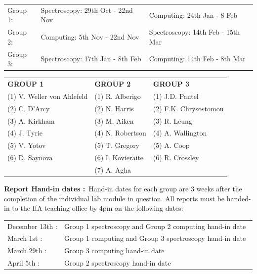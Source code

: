 \documentclass[12pt]{article}
\begin{document}
\begin{center}
\begin{tabular}{lll}
Group 1: & Spectroscopy: 29th Oct - 22nd Nov &Computing: 24th Jan - 8 Feb\\
Group 2: & Computing: 5th Nov - 22nd Nov     &Spectroscopy: 14th Feb - 15th Mar\\
Group 3: & Spectroscopy: 17th Jan - 8th Feb  & Computing: 14th Feb - 8th Mar
\end{tabular}
\end{center}

\begin{center}
\begin{tabular}{lll}

{\bf GROUP 1}                &   {\bf GROUP 2}      & {\bf GROUP 3}    \\
(1) V. Weller von Ahlefeld   & (1) R. Alberigo      & (1) J.D. Pantel\\
(2) C. D'Arcy                & (2) N. Harris        & (2) F.K. Chrysostomou\\
(3) A. Kirkham               & (3) M. Aiken         & (3) R. Leung     \\
(4) J. Tyrie                 & (4) N. Robertson     & (4) A. Wallington\\
(5) V. Yotov                 & (5) T. Gregory       & (5) A. Coop    \\
(6) D. Saynova               & (6) I. Kovieraite    & (6) R. Crossley \\
\phantom{(6) D. Saynova}     & (7) A. Agha  & \phantom{(6) R. Crossley} \\
\end{tabular}
\end{center}


{\bf Report Hand-in dates :}\  Hand-in dates for each group are 3
weeks after the completion of the individual lab module in
question. All reports must be handed-in to the IfA teaching office by
4pm on the following dates:\\

\begin{center}
\begin{tabular}{ll}
December 13th : & Group 1 spectroscopy and Group 2 computing hand-in date\ \\
March     1st : & Group 1 computing and Group 3 spectroscopy hand-in date\\
March    29th : & Group 3 computing hand-in date\\
April     5th : & Group 2 spectroscopy hand-in date
\end{tabular}
\end{center}
\end{document}
